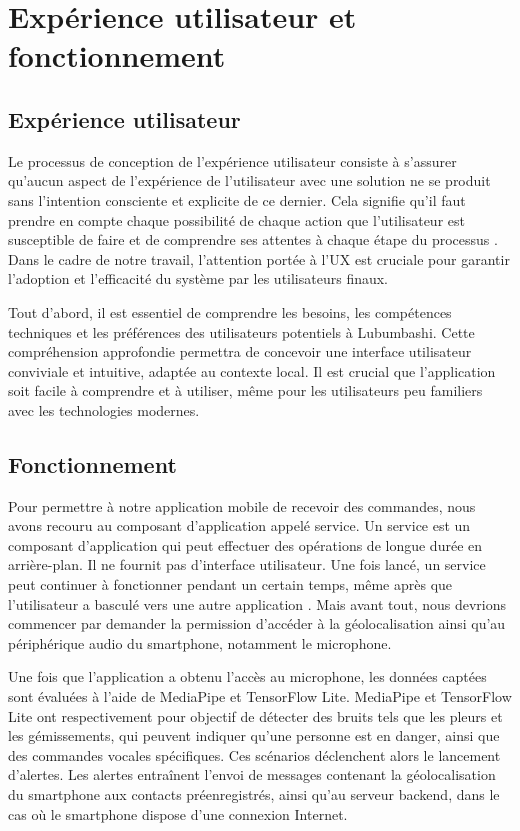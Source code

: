 \section{Expérience utilisateur et fonctionnement}
\subsection{Expérience utilisateur}
Le processus de conception de l'expérience utilisateur consiste à s'assurer qu'aucun aspect de l'expérience de l'utilisateur avec une solution ne se produit sans l’intention consciente et explicite de ce dernier. Cela signifie qu'il faut prendre en compte chaque possibilité de chaque action que l'utilisateur est susceptible de faire et de comprendre ses attentes à chaque étape du processus \cite{jesse_james_garrett_elements}.\\

Dans le cadre de notre travail, l'attention portée à l'UX est cruciale pour garantir l'adoption et l'efficacité du système par les utilisateurs finaux.

Tout d'abord, il est essentiel de comprendre les besoins, les compétences techniques et les préférences des utilisateurs potentiels à Lubumbashi. Cette compréhension approfondie permettra de concevoir une interface utilisateur conviviale et intuitive, adaptée au contexte local. Il est crucial que l'application soit facile à comprendre et à utiliser, même pour les utilisateurs peu familiers avec les technologies modernes.

\subsection{Fonctionnement}

Pour permettre à notre application mobile de recevoir des commandes, nous avons recouru au composant d’application appelé service. Un service est un composant d'application qui peut effectuer des opérations de longue durée en arrière-plan. Il ne fournit pas d'interface utilisateur. Une fois lancé, un service peut continuer à fonctionner pendant un certain temps, même après que l'utilisateur a basculé vers une autre application \cite{services}. Mais avant tout, nous devrions commencer par demander la permission d'accéder à la géolocalisation ainsi qu'au périphérique audio du smartphone, notamment le microphone.

Une fois que l'application a obtenu l'accès au microphone, les données captées sont évaluées à l'aide de MediaPipe et TensorFlow Lite. MediaPipe et TensorFlow Lite ont respectivement pour objectif de détecter des bruits tels que les pleurs et les gémissements, qui peuvent indiquer qu'une personne est en danger, ainsi que des commandes vocales spécifiques. Ces scénarios déclenchent alors le lancement d'alertes. Les alertes entraînent l'envoi de messages contenant la géolocalisation du smartphone aux contacts préenregistrés, ainsi qu'au serveur backend, dans le cas où le smartphone dispose d'une connexion Internet.


